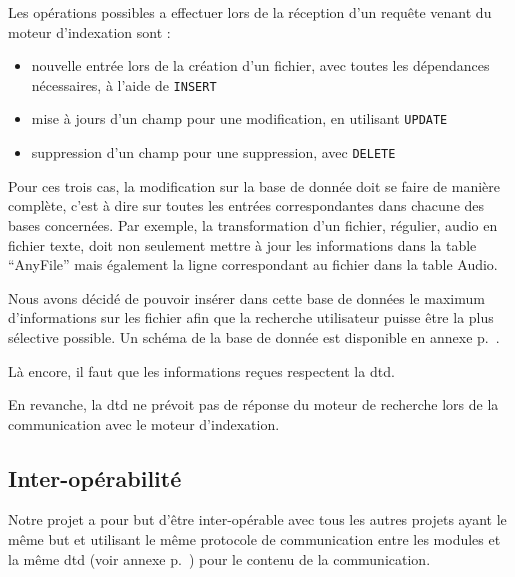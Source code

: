 \documentclass[a4paper,12pt]{report}
\begin{document}
Les opérations possibles a effectuer lors de la réception d'un requête venant du moteur d'indexation sont :
\begin{itemize}
\item nouvelle entrée lors de la création d'un \gls{fichier}, avec toutes les dépendances nécessaires, à l'aide de \verb"INSERT"
\item mise à jours d'un champ pour une modification, en utilisant \verb"UPDATE"
\item suppression d'un champ pour une suppression, avec \verb"DELETE"
\end{itemize}
Pour ces trois cas, la modification sur la base de donnée doit se faire de manière complète, c'est à dire sur toutes les entrées correspondantes dans chacune des bases concernées. Par exemple, la transformation d'un fichier, régulier, audio en fichier texte, doit non seulement mettre à jour les informations dans la table \enquote{AnyFile} mais également la ligne correspondant au fichier dans la table Audio.

Nous avons décidé de pouvoir insérer dans cette base de données le maximum d'informations sur les \gls{fichier} afin que la recherche utilisateur puisse être la plus sélective possible. Un schéma de la base de donnée est disponible en annexe p.~\pageref{bdd}.

Là encore, il faut que les informations reçues respectent la \gls{dtd}.

En revanche, la \gls{dtd} ne prévoit pas de réponse du moteur de recherche lors de la communication avec le moteur d'indexation.

\subsection{Inter-opérabilité}\label{inter_operabilite}
Notre projet a pour but d'être inter-opérable avec tous les autres projets ayant le même but et utilisant le même protocole de communication entre les modules et la même \gls{dtd} (voir annexe p.~\pageref{dtd}) pour le contenu de la communication.
\end{document}
